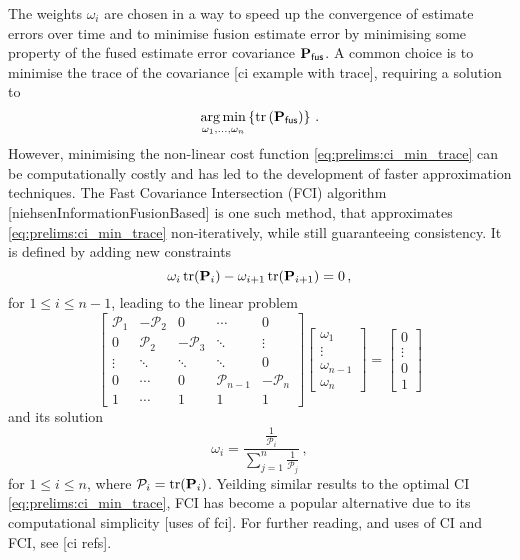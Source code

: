 The weights $\omega_i$ are chosen in a way to speed up the convergence of estimate errors over time and to minimise fusion estimate error by minimising some property of the fused estimate error covariance ${{\mathbf{P}}}_{\mathsf{fus}}$. A common choice is to minimise the trace of the covariance [ci example with trace], requiring a solution to
\begin{equation}\label{eq:prelims:ci_min_trace}
    \operatorname*{arg\,min}_{\omega_1,\dots,\omega_n} \left\{\operatorname{tr}\left({{\mathbf{P}}}_{\mathsf{fus}}\right)\right\}\,.
 \end{equation}
However, minimising the non-linear cost function \eqref{eq:prelims:ci_min_trace} can be computationally costly and has led to the development of faster approximation techniques. The Fast Covariance Intersection (FCI) algorithm [niehsenInformationFusionBased] is one such method, that approximates \eqref{eq:prelims:ci_min_trace} non-iteratively, while still guaranteeing consistency. It is defined by adding new constraints
\begin{equation}\label{eq:prelims:fci_added_constraints}
   \omega_i \operatorname{tr}({{\mathbf{P}}}_i) - \omega_{i+1} \operatorname{tr}({{\mathbf{P}}}_{i+1}) = 0\,,
\end{equation}
for $1\leq i\leq n-1$, leading to the linear problem
\begin{equation}\label{eq:prelims:fci_matrix_equation}
    \begin{bmatrix}
        \mathcal{P}_1 & -\mathcal{P}_2 & 0 & \cdots & 0 \\
        0 & \mathcal{P}_2 & -\mathcal{P}_3 & \ddots & \vdots \\
        \vdots & \ddots & \ddots & \ddots & 0 \\
        0 & \cdots & 0 & \mathcal{P}_{n-1} & -\mathcal{P}_n \\
        1 & \cdots & 1 & 1 & 1
    \end{bmatrix}
    \begin{bmatrix}
        \omega_1 \\
        \vdots \\
        \omega_{n-1} \\
        \omega_n
    \end{bmatrix}
    =
    \begin{bmatrix}
        0 \\
        \vdots \\
        0 \\
        1
    \end{bmatrix}
\end{equation}
and its solution
\begin{equation}\label{eq:prelims:fci_solution}
    \omega_i = \frac{\frac{1}{\mathcal{P}_i}}{\sum_{j=1}^n \frac{1}{\mathcal{P}_j}}\,,
\end{equation}
for $1\leq i\leq n$, where $\mathcal{P}_i = \operatorname{tr}({{\mathbf{P}}}_i)$. Yeilding similar results to the optimal CI \eqref{eq:prelims:ci_min_trace}, FCI has become a popular alternative due to its computational simplicity [uses of fci]. For further reading, and uses of CI and FCI, see [ci refs].

